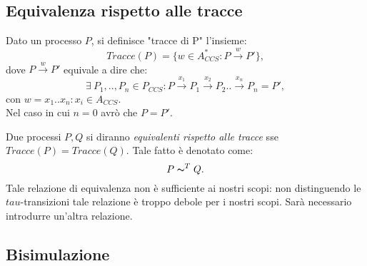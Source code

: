 \subsection{Equivalenza rispetto alle tracce}
\begin{deff}
	Dato un processo $P$, si definisce "tracce di P" l'insieme: $$Tracce(P)=\{w \in A_{CCS}^* : P \xrightarrow{w} P'  \}, $$ dove $ P \xrightarrow{w} P' $ equivale a dire che: $$ \exists\ P_1,..,P_n \in P_{CCS} : P \xrightarrow{x_1} P_1 \xrightarrow{x_2} P_2..\xrightarrow{x_n} P_n = P',$$
	con $w=x_1..x_n : x_i \in A_{CCS}.$\\
	Nel caso in cui $n=0$ avr\`o che $P=P'$.
\end{deff}
Due processi $P, Q$ si diranno \emph{equivalenti rispetto alle tracce} sse $Tracce(P)=Tracce(Q)$. Tale fatto \`e denotato come: $$P \thicksim^{T} Q.$$
Tale relazione di equivalenza non \`e sufficiente ai nostri scopi: non distinguendo le $tau$-transizioni tale relazione \`e troppo debole per i nostri scopi. Sar\`a necessario introdurre un'altra relazione.

\subsection{Bisimulazione}
